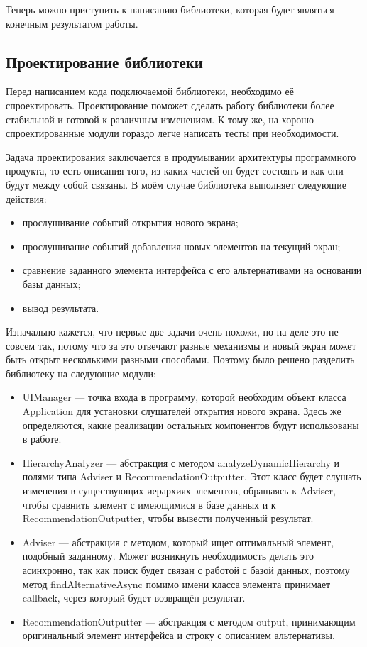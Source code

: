 \documentclass[a4paper,14pt]{extarticle} %
\begin{document}
	Теперь можно приступить к написанию библиотеки, которая будет являться конечным результатом работы.
	
	\subsection{Проектирование библиотеки}
	
	Перед написанием кода подключаемой библиотеки, необходимо её спроектировать. Проектирование поможет сделать работу библиотеки более стабильной и готовой к различным изменениям. К тому же, на хорошо спроектированные модули гораздо легче написать тесты при необходимости. 
	
	Задача проектирования заключается в продумывании архитектуры программного продукта, то есть описания того, из каких частей он будет состоять и как они будут между собой связаны. В моём случае библиотека выполняет следующие действия:
	\begin{itemize}
		\item прослушивание событий открытия нового экрана;
		\item прослушивание событий добавления новых элементов на текущий экран;
		\item сравнение заданного элемента интерфейса с его альтернативами на основании базы данных;
		\item вывод результата.
	\end{itemize}

	Изначально кажется, что первые две задачи очень похожи, но на деле это не совсем так, потому что за это отвечают разные механизмы и новый экран может быть открыт несколькими разными способами. Поэтому было решено разделить библиотеку на следующие модули:
	\begin{itemize}
		\item UIManager --- точка входа в программу, которой необходим объект класса Application для установки слушателей открытия нового экрана. Здесь же определяются, какие реализации остальных компонентов будут использованы в работе.
		\item HierarchyAnalyzer --- абстракция с методом analyzeDynamicHierarchy и полями типа Adviser и RecommendationOutputter. Этот класс будет слушать изменения в существующих иерархиях элементов, обращаясь к Adviser, чтобы сравнить элемент с имеющимися в базе данных и к RecommendationOutputter, чтобы вывести полученный результат.
		\item Adviser --- абстракция с методом, который ищет оптимальный элемент, подобный заданному. Может возникнуть необходимость делать это асинхронно, так как поиск будет связан с работой с базой данных, поэтому метод findAlternativeAsync помимо имени класса элемента принимает callback, через который будет возвращён результат.
		\item RecommendationOutputter --- абстракция с методом output, принимающим оригинальный элемент интерфейса и строку с описанием альтернативы.
	\end{itemize}
\end{document}
